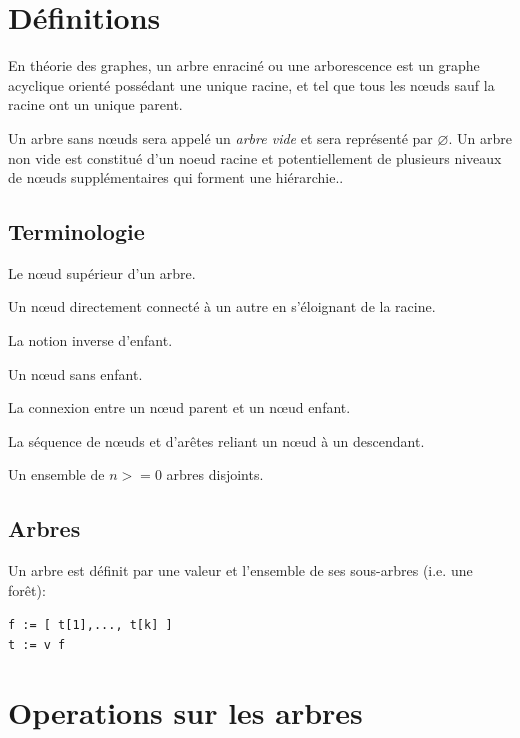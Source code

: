 \documentclass{article}
\newcommand{\code}	[2][0.9]		{\vspace{0mm}\begin{center}\colorbox{mygrey}{
							\begin{minipage}[t]{#1\columnwidth} 
							{\small \texttt{#2}}
							\end{minipage}}\end{center}}
\newcommand{\nulltree}	{\ensuremath{\varnothing}}
\begin{document}
\section{Définitions}

En théorie des graphes, un arbre enraciné ou une arborescence est un graphe acyclique orienté possédant une unique racine, et tel que tous les nœuds sauf la racine ont un unique parent. 

Un arbre sans nœuds sera appelé un \emph{arbre vide} et sera représenté par \nulltree. Un arbre non vide est constitué d'un noeud racine et potentiellement de plusieurs niveaux de nœuds supplémentaires qui forment une hiérarchie..


\subsection{Terminologie}

\begin{description}
 \setlength\itemsep{0.0em}
\item[Racine]	Le nœud supérieur d'un arbre.
\item[Enfant]	Un nœud directement connecté à un autre en s'éloignant de la racine.
\item[Parent]	La notion inverse d’enfant.
\item[Feuille]	Un nœud sans enfant.
\item[Arête]	La connexion entre un nœud parent et un nœud enfant.
\item[Chemin]	La séquence de nœuds et d’arêtes reliant un nœud à un descendant.
\item[Forêt]	Un ensemble de $n >= 0$ arbres disjoints.
\end{description}

\subsection{Arbres}
Un arbre est définit par une valeur et l’ensemble de ses sous-arbres (i.e. une forêt):
\code{f := [ t[1],..., t[k] ] \\
t :=  v f
}



\section{Operations sur les arbres}
\end{document}
